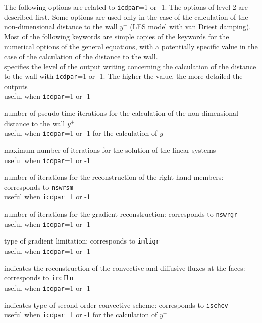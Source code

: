 The following options are related to {\tt icdpar}=1 or -1. The options of
level 2 are described first. Some options are used only in the case of
the calculation of the non-dimensional distance to the wall $y^+$ (LES model with
van Driest damping). Most of the following keywords are simple copies of the
keywords for the numerical options of the general equations, with a potentially
specific value in the case of the calculation of the distance to the wall.\\

{specifies the level of the output writing concerning the calculation of the
distance to the wall with {\tt icdpar}=1 or -1. The higher the value, the more
detailed the outputs\\
useful when {\tt icdpar}=1 or -1}

{number of pseudo-time iterations for the calculation of the non-dimensional
distance to the wall $y^+$\\
useful when {\tt icdpar}=1 or -1 for the calculation of $y^+$}

{maximum number of iterations for the solution of the linear systems\\
useful when {\tt icdpar}=1 or -1}

{number of iterations for the reconstruction of the right-hand members:
corresponds to {\tt nswrsm}\\
useful when {\tt icdpar}=1 or -1}

{number of iterations for the gradient reconstruction: corresponds to {\tt nswrgr}\\
useful when {\tt icdpar}=1 or -1}

{type of gradient limitation: corresponds to {\tt imligr}\\
useful when {\tt icdpar}=1 or -1}

{indicates the reconstruction of the convective and diffusive fluxes at
the faces: corresponds to {\tt ircflu}\\
useful when {\tt icdpar}=1 or -1}

{indicates type of second-order convective scheme: corresponds to {\tt ischcv}\\
useful when {\tt icdpar}=1 or -1 for the calculation of $y^+$}


